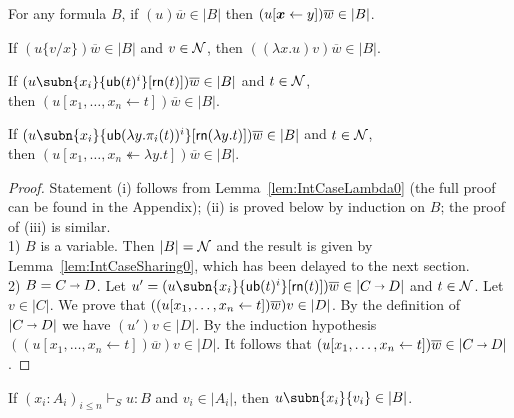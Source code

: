 \documentclass[orivec]{llncs}
\begin{document}
\begin{ALlemma}\label{lem:Red-AddSharings}
For any formula $B$,  if $(u)\overline{w}\in |B|$ then $(u\share*{\vv*x}y)\overline{w} \in |B|$.
\end{ALlemma}

\begin{ALlemma}\label{lem:IntCaseLambdaSharing}
\begin{compactenum}[\upshape(i)]
%
\item If $(u\{v/x\})\overline{w} \in |B|$ and $v\in\mathcal{N}$, then $((\lambda x.u) v)\overline{w} \in |B|$.
%
\item If $(u\subn{x_i}{\sn(t)^i}[\sh (t)])\overline{w} \in |B|$ and $t\in\mathcal{N}$, 
	\\ then $(u[x_1,\dots,x_n \leftarrow t])\overline{w} \in |B|$.
%
\item If $(u\subn{x_i}{\sn(\lambda y.\pi_i(t))^i}[\sh (\lambda y.t)])\overline{w} \in |B|$ and $t\in\mathcal{N}$,
	\\ then $(u[x_1,\dots,x_n \twoheadleftarrow \lambda y.t])\overline{w} \in |B|$.
%
\end{compactenum}
%
\end{ALlemma}

\begin{proof}
Statement (i) follows from Lemma~\ref{lem:IntCaseLambda0} (the full proof can be found in the Appendix); (ii) is proved below by induction on $B$; the proof of (iii) is similar.
%
\\
1) $B$ is a variable. Then $|B| = \mathcal{N}$ and the result is given by Lemma~\ref{lem:IntCaseSharing0}, which has been delayed to the next section.
\\
2) $B= C\vlim D$.
%
Let $u'=(u\subn{x_i}{\sn(t)^i}[\sh (t)])\overline{w} \in |C\vlim D|$ and $t\in\mathcal{N}$.
%
Let $v\in|C|$.
%
We prove that $((u\share xt)\overline{w})v \in |D|$.
%
By the definition of $|C\vlim D|$ we have $(u')v\in|D|$.
%
By the induction hypothesis $((u[x_1,\dots,x_n \leftarrow t])\overline{w})v \in |D|$.
%
It follows that $(u[x_1,\dots,x_n \leftarrow t])\overline{w} \in |C\vlim D|$.

\end{proof}

\begin{ALproposition}\label{prop:IntSubst}
If $(x_i:A_i)_{i\leq n}\vdash_S u:B$ and $v_i \in |A_i|$, then $u\subn{x_i}{v_i} \in |B|$.

\end{ALproposition}
\end{document}
